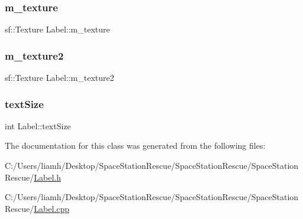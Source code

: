 \mbox{\label{class_label_a18bb96cd886ac4ce8635eaf4a46520a6}} 
\subsubsection{\texorpdfstring{m\_texture}{m\_texture}}
{\footnotesize\ttfamily sf\+::\+Texture Label\+::m\+\_\+texture\hspace{0.3cm}{\ttfamily [protected]}}

\mbox{\label{class_label_a903ee4e1e531bd4abe5d95651f594249}} 
\subsubsection{\texorpdfstring{m\_texture2}{m\_texture2}}
{\footnotesize\ttfamily sf\+::\+Texture Label\+::m\+\_\+texture2\hspace{0.3cm}{\ttfamily [protected]}}

\mbox{\label{class_label_ac0e8e759648e9a525d968779a3224b98}} 
\subsubsection{\texorpdfstring{textSize}{textSize}}
{\footnotesize\ttfamily int Label\+::text\+Size\hspace{0.3cm}{\ttfamily [protected]}}



The documentation for this class was generated from the following files\+:\begin{DoxyCompactItemize}
\item 
C\+:/\+Users/liamh/\+Desktop/\+Space\+Station\+Rescue/\+Space\+Station\+Rescue/\+Space\+Station\+Rescue/\mbox{\hyperlink{_label_8h}{Label.\+h}}\item 
C\+:/\+Users/liamh/\+Desktop/\+Space\+Station\+Rescue/\+Space\+Station\+Rescue/\+Space\+Station\+Rescue/\mbox{\hyperlink{_label_8cpp}{Label.\+cpp}}\end{DoxyCompactItemize}
